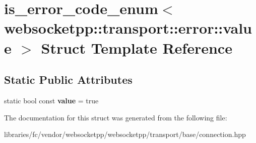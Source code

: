 \hypertarget{structis__error__code__enum_3_01websocketpp_1_1transport_1_1error_1_1value_01_4}{}\section{is\+\_\+error\+\_\+code\+\_\+enum$<$ websocketpp\+:\+:transport\+:\+:error\+:\+:value $>$ Struct Template Reference}
\label{structis__error__code__enum_3_01websocketpp_1_1transport_1_1error_1_1value_01_4}
\subsection*{Static Public Attributes}
\begin{DoxyCompactItemize}
\item 
\mbox{\label{structis__error__code__enum_3_01websocketpp_1_1transport_1_1error_1_1value_01_4_a75058d7048e16ee883f1b54b4e5bcbbf}} 
static bool const {\bfseries value} = true
\end{DoxyCompactItemize}


The documentation for this struct was generated from the following file\+:\begin{DoxyCompactItemize}
\item 
libraries/fc/vendor/websocketpp/websocketpp/transport/base/connection.\+hpp\end{DoxyCompactItemize}
